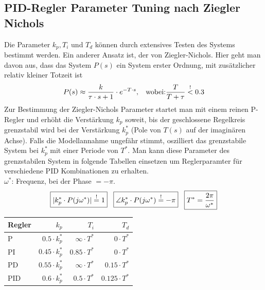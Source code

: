     \subsection{PID-Regler Parameter Tuning nach Ziegler Nichols}
        Die Parameter $k_p,T_i$ und $T_d$ können durch extensives Testen des Systems bestimmt werden. Ein anderer Ansatz ist, der von Ziegler-Nichols. Hier geht man davon aus, dass das System $P(s)$ ein System erster Ordnung, mit zusätzlicher relativ kleiner Totzeit ist 
        \[P(s) \approx \frac{k}{\tau\cdot s + 1}\cdot e^{-T\cdot s},\hspace{3mm} \textrm{wobei:} \frac{T}{T+\tau}\overset{!}{<} 0.3\]
        Zur Bestimmung der Ziegler-Nichols Parameter startet man mit einem reinen P-Regler und erhöht die Verstärkung $k_p$ soweit, bis der geschlossene Regelkreis grenzstabil wird bei der Verstärkung $k_p^*$ (Pole von $T(s)$ auf der imaginären Achse). Falls die Modellannahme ungefähr stimmt, oszilliert das grenzstabile System bei $k_p^*$ mit einer Periode von $T^*$. Man kann diese Parameter des grenzstabilen System in folgende Tabellen einsetzen um Reglerparamter für verschiedene PID Kombinationen zu erhalten.
        \\$\omega^*$: Frequenz, bei der Phase $= -\pi$.
        \[\boxed{|k_p^* \cdot P(j\omega^*)| \overset{!}{=} 1} \hspace{3mm}
        \boxed{\angle k_p^* \cdot P(j\omega^*)\overset{!}{=}-\pi} \hspace{3mm}
        \boxed{T^* =\frac{2\pi}{\omega^*}}\]
        \begin{center}
        {\renewcommand{\arraystretch}{1.5}
            \begin{tabular}{l r r r}
            Regler & $k_p$ & $T_i$ & $T_d$ \\
                 \hline
                P & $0.5\cdot k_p^*$ & $\infty \cdot T^*$ & $0 \cdot T^*$ \\
                PI & $0.45\cdot k_p^*$ & $0.85\cdot T^*$ & $0 \cdot T^*$\\
                PD & $0.55 \cdot k_p^* $& $\infty \cdot T^*$ &  $0.15\cdot T^*$\\
                PID & $0.6\cdot k_p^*$ & $0.5 \cdot T^*$ & $0.125 \cdot T^*$\\
            \end{tabular}}
        \end{center}
    
